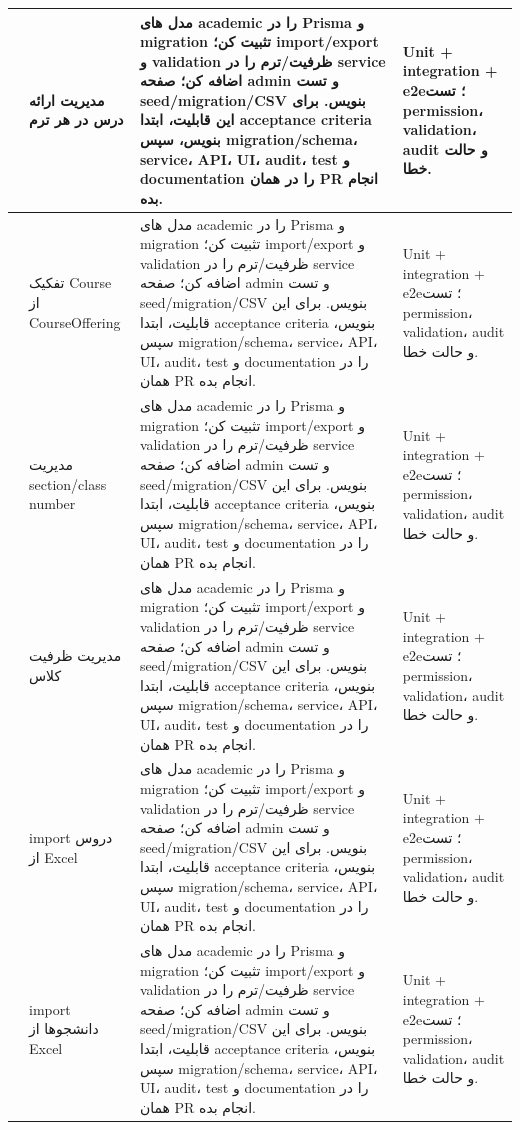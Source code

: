 \documentclass[11pt,a4paper]{article}
\begin{document}
\begin{longtable}{|>{\raggedleft\arraybackslash}p{}|>{\raggedleft\arraybackslash}p{}|>{\raggedleft\arraybackslash}p{}|>{\raggedleft\arraybackslash}p{}|}
24 & مدیریت ارائه درس در هر ترم & مدل های academic را در Prisma و migration تثبیت کن؛ import/export و validation ظرفیت/ترم را در service اضافه کن؛ صفحه admin و تست seed/migration/CSV بنویس. برای این قابلیت، ابتدا acceptance criteria بنویس، سپس migration/schema، service، API، UI، audit، test و documentation را در همان PR انجام بده. & Unit + integration + e2e؛ تست permission، validation، audit و حالت خطا. \\ \hline
25 & تفکیک Course از CourseOffering & مدل های academic را در Prisma و migration تثبیت کن؛ import/export و validation ظرفیت/ترم را در service اضافه کن؛ صفحه admin و تست seed/migration/CSV بنویس. برای این قابلیت، ابتدا acceptance criteria بنویس، سپس migration/schema، service، API، UI، audit، test و documentation را در همان PR انجام بده. & Unit + integration + e2e؛ تست permission، validation، audit و حالت خطا. \\ \hline
26 & مدیریت section/class number & مدل های academic را در Prisma و migration تثبیت کن؛ import/export و validation ظرفیت/ترم را در service اضافه کن؛ صفحه admin و تست seed/migration/CSV بنویس. برای این قابلیت، ابتدا acceptance criteria بنویس، سپس migration/schema، service، API، UI، audit، test و documentation را در همان PR انجام بده. & Unit + integration + e2e؛ تست permission، validation، audit و حالت خطا. \\ \hline
27 & مدیریت ظرفیت کلاس & مدل های academic را در Prisma و migration تثبیت کن؛ import/export و validation ظرفیت/ترم را در service اضافه کن؛ صفحه admin و تست seed/migration/CSV بنویس. برای این قابلیت، ابتدا acceptance criteria بنویس، سپس migration/schema، service، API، UI، audit، test و documentation را در همان PR انجام بده. & Unit + integration + e2e؛ تست permission، validation، audit و حالت خطا. \\ \hline
28 & import دروس از Excel & مدل های academic را در Prisma و migration تثبیت کن؛ import/export و validation ظرفیت/ترم را در service اضافه کن؛ صفحه admin و تست seed/migration/CSV بنویس. برای این قابلیت، ابتدا acceptance criteria بنویس، سپس migration/schema، service، API، UI، audit، test و documentation را در همان PR انجام بده. & Unit + integration + e2e؛ تست permission، validation، audit و حالت خطا. \\ \hline
29 & import دانشجوها از Excel & مدل های academic را در Prisma و migration تثبیت کن؛ import/export و validation ظرفیت/ترم را در service اضافه کن؛ صفحه admin و تست seed/migration/CSV بنویس. برای این قابلیت، ابتدا acceptance criteria بنویس، سپس migration/schema، service، API، UI، audit، test و documentation را در همان PR انجام بده. & Unit + integration + e2e؛ تست permission، validation، audit و حالت خطا. \\ \hline

\end{longtable}
\end{document}
